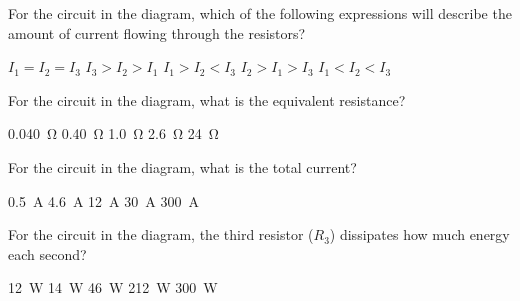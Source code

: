 \documentclass{../../../oss-ap12ibhl}
\begin{document}
\begin{questions}
  \question For the circuit in the diagram, which of the following
  expressions will describe the amount of current flowing through the
  resistors?
  \label{parallel1}
  \begin{choices}
    \choice $I_1=I_2=I_3$
    \choice $I_3>I_2>I_1$
    \choice $I_1>I_2<I_3$
    \choice $I_2>I_1>I_3$
    \choice $I_1<I_2<I_3$
  \end{choices}
    
  \question For the circuit in the diagram, what is the equivalent resistance?
  \begin{choices}
    \choice\SI{0.040}{\ohm}
    \choice\SI{0.40}{\ohm}
    \choice\SI{1.0}{\ohm}
    \choice\SI{2.6}{\ohm}
    \choice\SI{24}{\ohm}
  \end{choices}
    
  \question For the circuit in the diagram, what is the total current?
  \begin{choices}
    \choice\SI{0.5}{\ampere}
    \choice\SI{4.6}{\ampere}
    \choice\SI{12}{\ampere}
    \choice\SI{30}{\ampere}
    \choice\SI{300}{\ampere}
  \end{choices}
    
  \question For the circuit in the diagram, the third resistor ($R_3$)
  dissipates how much energy each second?
  \label{parallel4}
  \begin{choices}
    \choice\SI{12}{\watt}
    \choice\SI{14}{\watt}
    \choice\SI{46}{\watt}
    \choice\SI{212}{\watt}
    \choice\SI{300}{\watt}
  \end{choices}
    
%


\end{questions}
\end{document}

